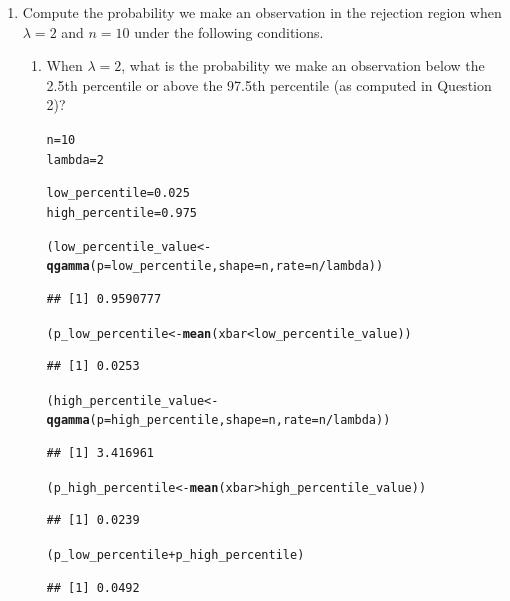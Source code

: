 \documentclass{article}\usepackage[]{graphicx}\usepackage[]{xcolor}
\makeatletter
\newcommand{\hlnum}[1]{\textcolor[rgb]{0.686,0.059,0.569}{#1}}%
\newcommand{\hlopt}[1]{\textcolor[rgb]{0,0,0}{#1}}%
\newcommand{\hldef}[1]{\textcolor[rgb]{0.345,0.345,0.345}{#1}}%
\newcommand{\hlkwb}[1]{\textcolor[rgb]{0.69,0.353,0.396}{#1}}%
\newcommand{\hlkwc}[1]{\textcolor[rgb]{0.333,0.667,0.333}{#1}}%
\newcommand{\hlkwd}[1]{\textcolor[rgb]{0.737,0.353,0.396}{\textbf{#1}}}%
\newenvironment{kframe}{%
 \def\at@end@of@kframe{}%
 \ifinner\ifhmode%
  \def\at@end@of@kframe{\end{minipage}}%
  \begin{minipage}{\columnwidth}%
 \fi\fi%
 \def\FrameCommand##1{\hskip\@totalleftmargin \hskip-\fboxsep
 \colorbox{shadecolor}{##1}\hskip-\fboxsep
     \hskip-\linewidth \hskip-\@totalleftmargin \hskip\columnwidth}%
 \MakeFramed {\advance\hsize-\width
   \@totalleftmargin\z@ \linewidth\hsize
   \@setminipage}}%
 {\par\unskip\endMakeFramed%
 \at@end@of@kframe}
\newenvironment{knitrout}{}{} %
\makeatother
\begin{document}
\begin{enumerate}
\begin{enumerate}
  \end{enumerate}
  \item Compute the probability we make an observation in the rejection region
  when $\lambda=2$ and $n=10$ under the following conditions.
  \begin{enumerate}
    \item When $\lambda=2$, what is the probability we make an observation below the 2.5th percentile or above the 97.5th percentile (as computed 
    in Question 2)? 
    
\begin{knitrout}\scriptsize
{}\color{fgcolor}\begin{kframe}
\begin{alltt}
\hldef{n} \hlkwb{=} \hlnum{10}
\hldef{lambda} \hlkwb{=} \hlnum{2}

\hldef{low_percentile} \hlkwb{=} \hlnum{0.025}
\hldef{high_percentile} \hlkwb{=} \hlnum{0.975}

\hldef{(low_percentile_value} \hlkwb{<-} \hlkwd{qgamma}\hldef{(}\hlkwc{p} \hldef{= low_percentile,} \hlkwc{shape} \hldef{= n,} \hlkwc{rate} \hldef{= n}\hlopt{/}\hldef{lambda))}
\end{alltt}
\begin{verbatim}
## [1] 0.9590777
\end{verbatim}
\begin{alltt}
\hldef{(p_low_percentile} \hlkwb{<-} \hlkwd{mean}\hldef{(xbar}\hlopt{<}\hldef{low_percentile_value))}
\end{alltt}
\begin{verbatim}
## [1] 0.0253
\end{verbatim}
\begin{alltt}
\hldef{(high_percentile_value} \hlkwb{<-} \hlkwd{qgamma}\hldef{(}\hlkwc{p} \hldef{= high_percentile,} \hlkwc{shape} \hldef{= n,} \hlkwc{rate} \hldef{= n}\hlopt{/}\hldef{lambda))}
\end{alltt}
\begin{verbatim}
## [1] 3.416961
\end{verbatim}
\begin{alltt}
\hldef{(p_high_percentile} \hlkwb{<-} \hlkwd{mean}\hldef{(xbar}\hlopt{>}\hldef{high_percentile_value))}
\end{alltt}
\begin{verbatim}
## [1] 0.0239
\end{verbatim}
\begin{alltt}
\hldef{(p_low_percentile} \hlopt{+} \hldef{p_high_percentile)}
\end{alltt}
\begin{verbatim}
## [1] 0.0492
\end{verbatim}
\end{kframe}
\end{knitrout}


\end{enumerate}
\end{enumerate}
\end{document}
